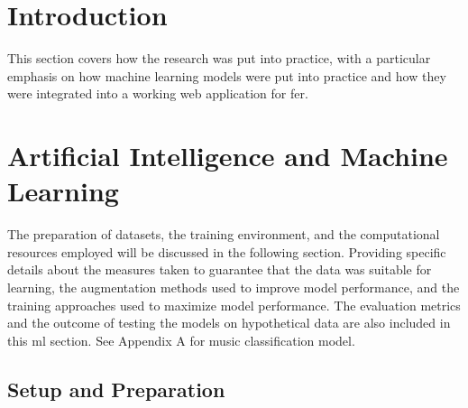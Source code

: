 \section{Introduction}
This section covers how the research was put into practice, with a particular emphasis on how machine learning models were put into practice and how they were integrated into a working web application for \gls{fer}.
\section{Artificial Intelligence and Machine Learning}
The preparation of datasets, the training environment, and the computational resources employed will be discussed in the following section.
Providing specific details about the measures taken to guarantee that the data was suitable for learning, the augmentation methods used to improve model performance, and the training approaches used to maximize model performance.
The evaluation metrics and the outcome of testing the models on hypothetical data are also included in this \gls{ml} section.
See Appendix A for music classification model. 
\subsection{Setup and Preparation}

